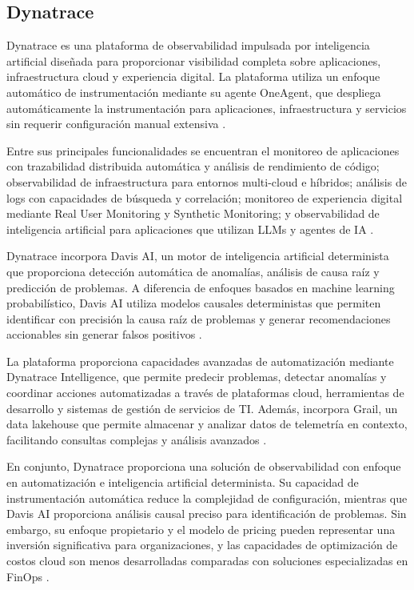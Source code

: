 \subsection{Dynatrace}

Dynatrace es una plataforma de observabilidad impulsada por inteligencia artificial diseñada para proporcionar visibilidad completa sobre aplicaciones, infraestructura cloud y experiencia digital. La plataforma utiliza un enfoque automático de instrumentación mediante su agente OneAgent, que despliega automáticamente la instrumentación para aplicaciones, infraestructura y servicios sin requerir configuración manual extensiva \parencite{Dynatrace2026}.

Entre sus principales funcionalidades se encuentran el monitoreo de aplicaciones con trazabilidad distribuida automática y análisis de rendimiento de código; observabilidad de infraestructura para entornos multi-cloud e híbridos; análisis de logs con capacidades de búsqueda y correlación; monitoreo de experiencia digital mediante Real User Monitoring y Synthetic Monitoring; y observabilidad de inteligencia artificial para aplicaciones que utilizan LLMs y agentes de IA \parencite{Dynatrace2026}.

Dynatrace incorpora Davis AI, un motor de inteligencia artificial determinista que proporciona detección automática de anomalías, análisis de causa raíz y predicción de problemas. A diferencia de enfoques basados en machine learning probabilístico, Davis AI utiliza modelos causales deterministas que permiten identificar con precisión la causa raíz de problemas y generar recomendaciones accionables sin generar falsos positivos \parencite{Dynatrace2026}.

La plataforma proporciona capacidades avanzadas de automatización mediante Dynatrace Intelligence, que permite predecir problemas, detectar anomalías y coordinar acciones automatizadas a través de plataformas cloud, herramientas de desarrollo y sistemas de gestión de servicios de TI. Además, incorpora Grail, un data lakehouse que permite almacenar y analizar datos de telemetría en contexto, facilitando consultas complejas y análisis avanzados \parencite{Dynatrace2026}.

En conjunto, Dynatrace proporciona una solución de observabilidad con enfoque en automatización e inteligencia artificial determinista. Su capacidad de instrumentación automática reduce la complejidad de configuración, mientras que Davis AI proporciona análisis causal preciso para identificación de problemas. Sin embargo, su enfoque propietario y el modelo de pricing pueden representar una inversión significativa para organizaciones, y las capacidades de optimización de costos cloud son menos desarrolladas comparadas con soluciones especializadas en FinOps \parencite{Dynatrace2026}.

